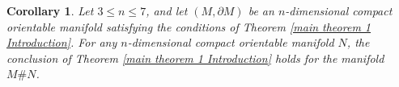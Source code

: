 \documentclass[11pt,letterpaper]{amsart}
\newtheorem{corollary}[theorem]{Corollary}
\theoremstyle{definition}
\theoremstyle{remark}
\numberwithin{equation}{section}
\begin{document}

\begin{corollary}\label{cor3}
    Let $3 \leq n \leq 7$, and let $(M, \partial M)$ be an $n$-dimensional compact orientable manifold satisfying the conditions of Theorem \ref{main theorem 1 Introduction}. For any $n$-dimensional compact orientable manifold $N$, the conclusion of Theorem \ref{main theorem 1 Introduction} holds for the manifold $M \# N$.
\end{corollary}
\end{document}
